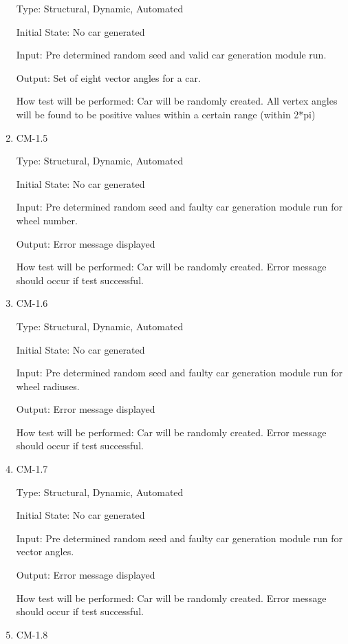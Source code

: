 \documentclass[12pt, titlepage]{article}
\begin{document}
\begin{enumerate}
Type: Structural, Dynamic, Automated
					
Initial State: No car generated
					
Input: Pre determined random seed and valid car generation module run.
					
\textcolor{RoyalPurple}{Output: Set of eight vector angles for a car.}
					
\textcolor{RoyalPurple}{How test will be performed: Car will be randomly created. All 
vertex angles will 
be found to be positive values within a certain range (within 2*pi)}

\item{CM-1.5\\}

Type: Structural, Dynamic, Automated
					
Initial State: No car generated
					
Input: Pre determined random seed and faulty car generation module run for wheel 
number.
					
Output: Error message displayed
					
How test will be performed:  Car will be randomly created. Error message should 
occur if test successful.

\item{CM-1.6\\}

Type: Structural, Dynamic, Automated
					
Initial State: No car generated
					
Input: Pre determined random seed and faulty car generation module run for wheel 
radiuses.
					
Output: Error message displayed
					
How test will be performed: Car will be randomly created. Error message should 
occur if test successful.

\item{CM-1.7\\}

Type: Structural, Dynamic, Automated
					
Initial State: No car generated
					
Input: Pre determined random seed and faulty car generation module run for 
vector angles.
					
Output: Error message displayed
					
How test will be performed: Car will be randomly created. Error message should 
occur if test successful.

\item{CM-1.8\\}


\end{enumerate}
\end{document}

